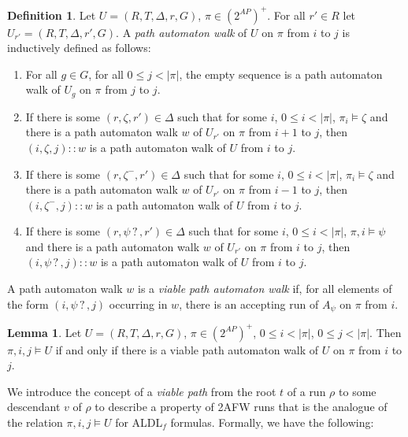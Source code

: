 \documentclass{lmcs}
\theoremstyle{definition}
\newtheorem{lemma}[thm]{Lemma}
\newtheorem{definition}[thm]{Definition}
\DeclareMathOperator{\?}{?}
\begin{document}
\begin{definition}\label{def:path_automaton_walk}
    Let $U = (R,T,\Delta,r,G)$, $\pi \in (2^{AP})^+$. For all $r' \in R$ let $U_{r'} = (R,T,\Delta,r',G)$.
    A \textit{path automaton walk} of $U$ on $\pi$ from $i$ to $j$ is inductively defined as follows:
    \begin{enumerate}
        \item For all $g \in G$, for all $0 \leq j < |\pi|$, the empty sequence is a path automaton walk of $U_g$ on $\pi$ from $j$ to $j$.
        \item If there is some $(r,\zeta,r') \in \Delta$ such that for some $i$, $0 \leq i < |\pi|$, $\pi_i \models \zeta$ and there is a path automaton walk $w$
            of $U_{r'}$ on $\pi$ from $i+1$ to $j$, then $(i,\zeta,j) :: w$ is a path automaton walk of $U$ from $i$ to $j$.
        \item If there is some $(r,\zeta^-,r') \in \Delta$ such that for some $i$, $0 \leq i < |\pi|$, $\pi_i \models \zeta$ and there is a path automaton walk $w$
            of $U_{r'}$ on $\pi$ from $i-1$ to $j$, then $(i,\zeta^-,j) :: w$ is a path automaton walk of $U$ from $i$ to $j$.
        \item If there is some $(r,\psi \?,r') \in \Delta$ such that for some $i$, $0 \leq i < |\pi|$, $\pi,i \models \psi$ and there is a path automaton walk $w$
            of $U_{r'}$ on $\pi$ from $i$ to $j$, then $(i,\psi \? ,j) :: w$ is a path automaton walk of $U$ from $i$ to $j$.
    \end{enumerate}
    A path automaton walk $w$ is a \textit{viable path automaton walk} if, for all elements of the form $(i, \psi \? ,j)$
    occurring in $w$, there is an accepting run of $A_\psi$ on $\pi$ from $i$.

\end{definition}


\begin{lemma}\label{lem:walk_iff_relation}
    Let $U = (R,T,\Delta,r,G)$, $\pi \in (2^{AP})^+$, $0 \leq i < |\pi|$, $0 \leq j < |\pi|$. Then $\pi,i,j \models U$ if and only if
  there is a viable path automaton walk of $U$ on $\pi$ from $i$ to $j$.
\end{lemma}

We introduce the concept of a \textit{viable path} from the root $t$ of a run $\rho$
to some descendant $v$ of $\rho$ to describe a property of 2AFW runs that is the analogue
of the relation $\pi,i,j \models U$ for ALDL$_f$ formulas. Formally, we have the following:
\end{document}
